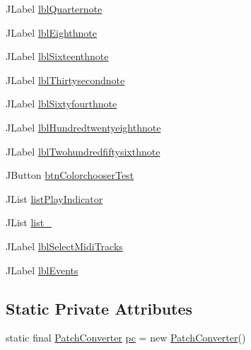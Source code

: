 \begin{DoxyCompactItemize}
\item 
J\+Label \hyperlink{classcom_1_1lclion_1_1midigui_1_1_dialog_track_import_ae5cfb7a856d76c093ed85d9e8d0548bd}{lbl\+Quarternote}
\item 
J\+Label \hyperlink{classcom_1_1lclion_1_1midigui_1_1_dialog_track_import_a12dd2fd5b473e16168d5cc9b53b064a1}{lbl\+Eighthnote}
\item 
J\+Label \hyperlink{classcom_1_1lclion_1_1midigui_1_1_dialog_track_import_a9ea6ef5b9dce4d50407ffceffd2825a5}{lbl\+Sixteenthnote}
\item 
J\+Label \hyperlink{classcom_1_1lclion_1_1midigui_1_1_dialog_track_import_a70c665b64629375a224fe62984806e5e}{lbl\+Thirtysecondnote}
\item 
J\+Label \hyperlink{classcom_1_1lclion_1_1midigui_1_1_dialog_track_import_a56ec877aa439e951f0a2a4f5b3a5a1bb}{lbl\+Sixtyfourthnote}
\item 
J\+Label \hyperlink{classcom_1_1lclion_1_1midigui_1_1_dialog_track_import_a78f15a440795871a9eab7aa4111114e0}{lbl\+Hundredtwentyeighthnote}
\item 
J\+Label \hyperlink{classcom_1_1lclion_1_1midigui_1_1_dialog_track_import_a9cdecbe937d5853a3e6c5cdf1d0db1e5}{lbl\+Twohundredfiftysixthnote}
\item 
J\+Button \hyperlink{classcom_1_1lclion_1_1midigui_1_1_dialog_track_import_acf6001c3f20d4daa3dcec1516a72a276}{btn\+Colorchooser\+Test}
\item 
J\+List \hyperlink{classcom_1_1lclion_1_1midigui_1_1_dialog_track_import_a7271a6017c882f92a2022cc6cc688fb0}{list\+Play\+Indicator}
\item 
J\+List \hyperlink{classcom_1_1lclion_1_1midigui_1_1_dialog_track_import_a8f0df5ab6c1a8287af5ce9ff2fcfd8e3}{list\+\_}
\item 
J\+Label \hyperlink{classcom_1_1lclion_1_1midigui_1_1_dialog_track_import_a3f8471fb3f216ae539154e089ce46ee7}{lbl\+Select\+Midi\+Tracks}
\item 
J\+Label \hyperlink{classcom_1_1lclion_1_1midigui_1_1_dialog_track_import_aad844b17249eb755348b263953102b01}{lbl\+Events}
\end{DoxyCompactItemize}
\subsection*{Static Private Attributes}
\begin{DoxyCompactItemize}
\item 
static final \hyperlink{classcom_1_1lclion_1_1midiparser_1_1_patch_converter}{Patch\+Converter} \hyperlink{classcom_1_1lclion_1_1midigui_1_1_dialog_track_import_a629a55ce1fe3a51976a23411dcf2ca13}{pc} = new \hyperlink{classcom_1_1lclion_1_1midiparser_1_1_patch_converter}{Patch\+Converter}()
\end{DoxyCompactItemize}


